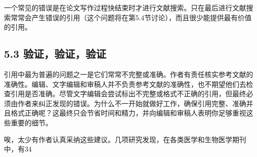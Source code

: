 一个常见的错误是在论文写作过程快结束时才进行文献搜索。只在最后进行文献搜索常常会产生错误的引用（这个问题将在第5.4节讨论），而且很少能提供最有价值的引用。

\subsection*{5.3 验证，验证，验证}
引用中最为普遍的问题之一是它们常常不完整或准确。作者有责任核实参考文献的准确性。编辑、文字编辑和审稿人并不负责参考文献的准确性，也不期望他们去检查引用是否准确。尽管文字编辑会尝试标出不完整或格式不正确的引用，但最终必须由作者来纠正发现的错误。为什么不一开始就做好工作，确保引用完整、准确并且格式正确呢？这最终只会节省时间和精力，并向编辑和审稿人表明你足够重视这些重要的细节。

唉，太少有作者认真采纳这些建议。几项研究发现，在各类医学和生物医学期刊中，有34%

